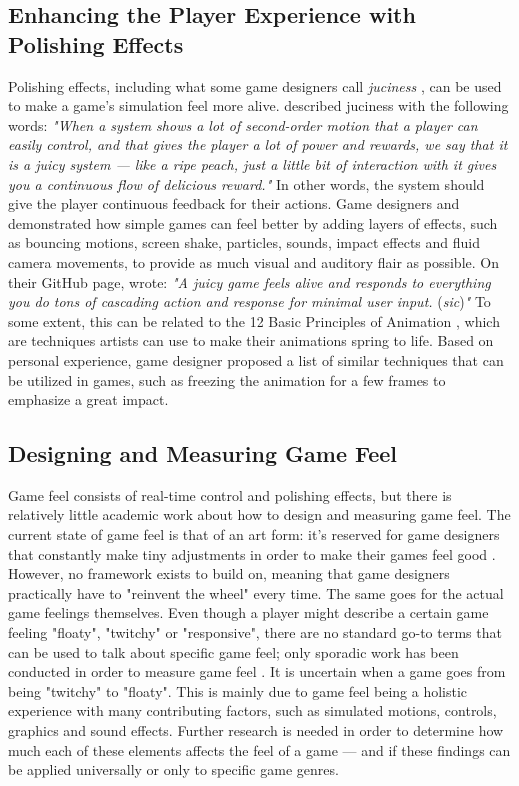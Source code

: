 \subsection{Enhancing the Player Experience with Polishing Effects}
Polishing effects, including what some game designers call \textit{juciness} \cite{juice3}, can be used to make a game's simulation feel more alive. \cite{schell_art_2008} described juciness with the following words: \textit{"When a system shows a lot of second-order motion that a player can easily control, and that gives the player a lot of power and rewards, we say that it is a juicy system --- like a ripe peach, just a little bit of interaction with it gives you a continuous flow of delicious reward."} In other words, the system should give the player continuous feedback for their actions. Game designers \cite{juice1} and \cite{juice2} demonstrated how simple games can feel better by adding layers of effects, such as bouncing motions, screen shake, particles, sounds, impact effects and fluid camera movements, to provide as much visual and auditory flair as possible. On their GitHub page, \cite{juice1} wrote: \textit{"A juicy game feels alive and responds to everything you do tons of cascading action and response for minimal user input.} (\textit{sic})\textit{"} To some extent, this can be related to the 12 Basic Principles of Animation \cite{animation}, which are techniques artists can use to make their animations spring to life. Based on personal experience, game designer \cite{sticky} proposed a list of similar techniques that can be utilized in games, such as freezing the animation for a few frames to emphasize a great impact.

\subsection{Designing and Measuring Game Feel}
Game feel consists of real-time control and polishing effects, but there is relatively little academic work about how to design and measuring game feel. The current state of game feel is that of an art form: it's reserved for game designers that constantly make tiny adjustments in order to make their games feel good \cite{meatboy1, meatboy2, juicyBeast, gameFeelTips}. However, no framework exists to build on, meaning that game designers practically have to "reinvent the wheel" every time. The same goes for the actual game feelings themselves. Even though a player might describe a certain game feeling "floaty", "twitchy" or "responsive", there are no standard go-to terms that can be used to talk about specific game feel; only sporadic work has been conducted in order to measure game feel \cite{feelBetter}. It is uncertain when a game goes from being "twitchy" to "floaty". This is mainly due to game feel being a holistic experience with many contributing factors, such as simulated motions, controls, graphics and sound effects. Further research is needed in order to determine how much each of these elements affects the feel of a game --- and if these findings can be applied universally or only to specific game genres.